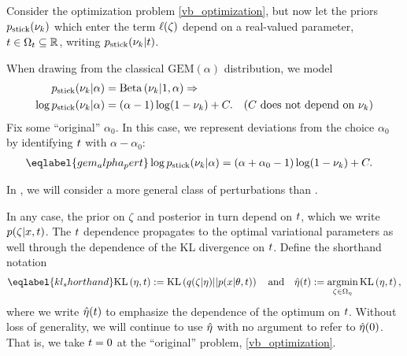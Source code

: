 Consider the optimization problem \eqref{vb_optimization}, but now let the
priors $p_{\mathrm{stick}}(\nu_{k})$ which enter the term $\ell(\zeta)$ depend on a
real-valued parameter, $t \in \Omega_{t} \subseteq \mathbb{R}$, writing
$p_{\mathrm{stick}}(\nu_{k} \vert t)$.

\begin{ex}
%
When drawing from the classical $\mathrm{GEM}(\alpha)$ distribution, we
model
%
\begin{align*}
%
\pstick(\nuk \vert \alpha) ={}&
    \betadist{\nuk \vert 1, \alpha} \Rightarrow\\
\log \pstick(\nuk \vert \alpha) ={}&
    (\alpha - 1) \log(1 - \nuk) + \const. &
    \constdesc{\nuk}
%
\end{align*}
%
Fix some ``original'' $\alpha_0$.  In this case, we represent deviations from the
choice $\alpha_0$ by identifying $t$ with $\alpha - \alpha_0$:
%
\begin{align}\eqlabel{gem_alpha_pert}
%
\log \pstick(\nuk \vert \alpha) ={}&
    (\alpha + \alpha_0 - 1) \log(1 - \nuk) + \const.
%
\end{align}
%
\end{ex}

In , we will consider a more general class of
perturbations than .

In any case, the prior on $\zeta$ and posterior in turn depend on $t$, which we
write $p(\zeta \vert x, t)$. The $t$ dependence propagates to the optimal
variational parameters as well through the dependence of the KL divergence on
$t$.  Define the shorthand notation
%
\begin{align}\eqlabel{kl_shorthand}
%
\KL{\eta, \t} := \KL{\q(\zeta \vert \eta) || p(\x \vert \theta, \t)}
\mathand
\etaopt(\t) := \argmin_{\zeta \in \etadom} \KL{\eta, \t},
%
\end{align}
%
where we write $\hat\eta(t)$ to emphasize the dependence of the optimum on $t$.
Without loss of generality, we will continue to use $\hat\eta$ with no argument
to refer to $\hat\eta(0)$.  That is, we take $t = 0$ at the ``original''
problem, \eqref{vb_optimization}.

